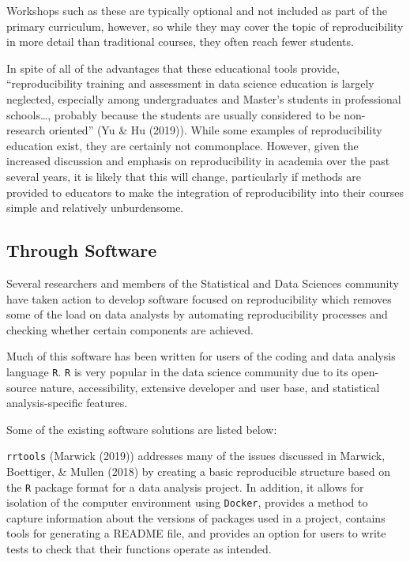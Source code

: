\documentclass[12pt,twoside]{reedthesis}
\begin{document}
Workshops such as these are typically optional and not included as part of the primary curriculum, however, so while they may cover the topic of reproducibility in more detail than traditional courses, they often reach fewer students.

In spite of all of the advantages that these educational tools provide, ``reproducibility training and assessment in data science education is largely neglected, especially among undergraduates and Master's students in professional schools\ldots, probably because the students are usually considered to be non-research oriented'' (Yu \& Hu (2019)). While some examples of reproducibility education exist, they are certainly not commonplace. However, given the increased discussion and emphasis on reproducibility in academia over the past several years, it is likely that this will change, particularly if methods are provided to educators to make the integration of reproducibility into their courses simple and relatively unburdensome.

\hypertarget{through-software}{%
\subsection{Through Software}\label{through-software}}

Several researchers and members of the Statistical and Data Sciences community have taken action to develop software focused on reproducibility which removes some of the load on data analysts by automating reproducibility processes and checking whether certain components are achieved.

Much of this software has been written for users of the coding and data analysis language \texttt{R}. \texttt{R} is very popular in the data science community due to its open-source nature, accessibility, extensive developer and user base, and statistical analysis-specific features.

Some of the existing software solutions are listed below:

\texttt{rrtools} (Marwick (2019)) addresses many of the issues discussed in Marwick, Boettiger, \& Mullen (2018) by creating a basic reproducible structure based on the \texttt{R} package format for a data analysis project. In addition, it allows for isolation of the computer environment using \texttt{Docker}, provides a method to capture information about the versions of packages used in a project, contains tools for generating a README file, and provides an option for users to write tests to check that their functions operate as intended.
\end{document}
